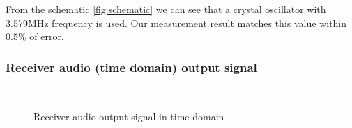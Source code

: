 \documentclass[
11pt, %
a4paper, %
oneside, %
headinclude,footinclude, %
BCOR5mm, %
]{scrartcl}
\begin{document}
From the schematic \ref{fig:schematic} we can see that a crystal oscillator with 3.579MHz frequency is used.
Our measurement result matches this value within $0.5\%$ of error.


\newpage
\subsubsection{Receiver audio (time domain) output signal}

\begin{figure}[h!]
    \centering
     \quad
     \\
 
    \caption{Receiver audio output signal in time domain}
    \label{fig:Receiver audio output}
  \end{figure}

\newpage
\end{document}
